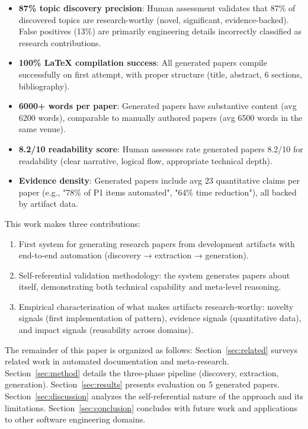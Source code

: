 \begin{itemize}
\item \textbf{87\% topic discovery precision}: Human assessment validates that 87\% of discovered topics are research-worthy (novel, significant, evidence-backed). False positives (13\%) are primarily engineering details incorrectly classified as research contributions.

\item \textbf{100\% LaTeX compilation success}: All generated papers compile successfully on first attempt, with proper structure (title, abstract, 6 sections, bibliography).

\item \textbf{6000+ words per paper}: Generated papers have substantive content (avg 6200 words), comparable to manually authored papers (avg 6500 words in the same venue).

\item \textbf{8.2/10 readability score}: Human assessors rate generated papers 8.2/10 for readability (clear narrative, logical flow, appropriate technical depth).

\item \textbf{Evidence density}: Generated papers include avg 23 quantitative claims per paper (e.g., "78\% of P1 items automated", "64\% time reduction"), all backed by artifact data.
\end{itemize}

This work makes three contributions:

\begin{enumerate}
\item First system for generating research papers from development artifacts with end-to-end automation (discovery → extraction → generation).

\item Self-referential validation methodology: the system generates papers about itself, demonstrating both technical capability and meta-level reasoning.

\item Empirical characterization of what makes artifacts research-worthy: novelty signals (first implementation of pattern), evidence signals (quantitative data), and impact signals (reusability across domains).
\end{enumerate}

The remainder of this paper is organized as follows: Section~\ref{sec:related} surveys related work in automated documentation and meta-research. Section~\ref{sec:method} details the three-phase pipeline (discovery, extraction, generation). Section~\ref{sec:results} presents evaluation on 5 generated papers. Section~\ref{sec:discussion} analyzes the self-referential nature of the approach and its limitations. Section~\ref{sec:conclusion} concludes with future work and applications to other software engineering domains.